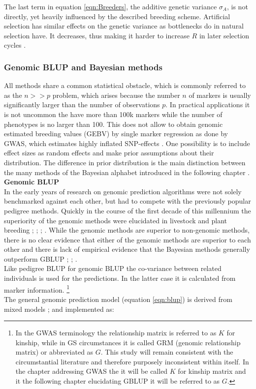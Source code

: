 The last term in equation \ref{eqn:Breeders}, the additive genetic variance $\sigma_A$, is
not directly, yet heavily influenced by the described breeding scheme. Artificial
selection has similar effects on the genetic variance as bottlenecks do in natural selection
have. It decreases, thus making it harder to increase $R$ in later selection cycles
\cite{walsh2018}.

\subsubsection{Genomic BLUP and Bayesian methods}\label{blup:bayes}

All methods share a common statistical obstacle, which is commonly referred to as the
$n >> p$ problem, which arises because the number $n$ of markers is usually significantly
larger than the number of observations $p$. In practical applications it is not uncommon
the have more than 100k markers while the number of phenotypes is no larger than 100. This
does not allow to obtain genomic estimated breeding values (GEBV) by single marker
regression as done by GWAS, which estimates highly inflated SNP-effects
\cite{korte2013advantages}. One possibility is to include effect sizes as random effects
and make prior assumptions about their distribution. The difference in prior distribution
is the main distinction between the many methods of the Bayesian alphabet introduced in
the following chapter \cite{gianola2013}.\\

\noindent
\textbf{Genomic BLUP} \\ In the early years of research on genomic prediction algorithms
were not solely benchmarked against each other, but had to compete with the previously
popular pedigree methods. Quickly in the course of the first decade of this millennium the
superiority of the genomic methods were elucidated in livestock and plant breeding
\cite{habier2007impact}; \cite{vanraden2008efficient}; \cite{vanraden2008reliability};
\cite{harris2009genomic}. While the genomic methods are superior to non-genomic methods,
there is no clear evidence that either of the genomic methods are superior to each other
and there is lack of empirical evidence that the Bayesian methods generally outperform
GBLUP \cite{moser2009comparison} ; \cite{bernardo2010breeding}; \cite{azodi2019}. \\
Like pedigree BLUP for genomic BLUP the co-variance between related individuals is used
for the predictions. In the latter case it is calculated from marker information.
\footnote{In the GWAS terminology the relationship matrix is referred to as $K$ for
  kinship, while in GS circumstances it is called GRM (genomic relationship matrix) or
  abbreviated as $G$. This study will remain consistent with the circumstantial literature
  and therefore purposely inconsistent within itself. In the chapter addressing GWAS the
  it will be called $K$ for kinship matrix and it the following chapter elucidating GBLUP
  it will be referred to as $G$.}
\\
The general genomic prediction model (equation \ref{eqn:blup}) is derived from mixed
models \cite{henderson1975best}; \cite{vanraden2008efficient} and implemented as:

